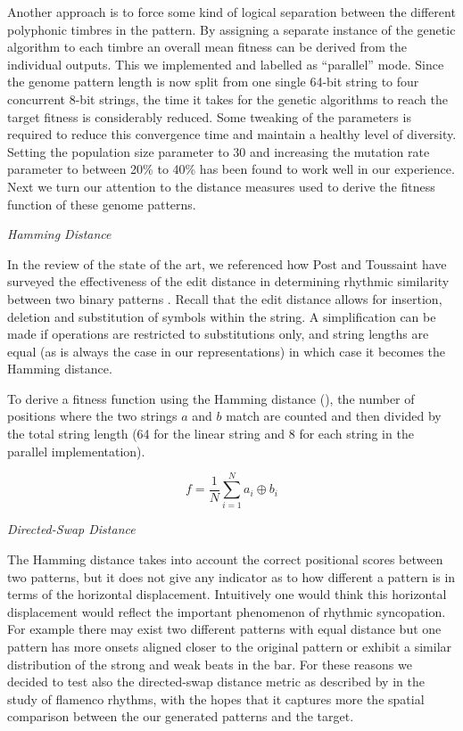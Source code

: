 Another approach is to force some kind of logical separation between the different polyphonic timbres in the pattern. By assigning a separate instance of the genetic algorithm to each timbre an overall mean fitness can be derived from the individual outputs. This we implemented and labelled as ``parallel'' mode. Since the genome pattern length is now split from one single 64-bit string to four concurrent 8-bit strings, the time it takes for the genetic algorithms to reach the target fitness is considerably reduced. Some tweaking of the parameters is required to reduce this convergence time and maintain a healthy level of diversity. Setting the population size parameter to 30 and increasing the mutation rate parameter to between 20\% to 40\% has been found to work well in our experience. Next we turn our attention to the distance measures used to derive the fitness function of these genome patterns.

\textit{Hamming Distance}

In the review of the state of the art, we referenced how Post and Toussaint have surveyed the effectiveness of the edit distance in determining rhythmic similarity between two binary patterns \citep{Post2011} . Recall that the edit distance allows for insertion, deletion and substitution of symbols within the string. A simplification can be made if operations are restricted to substitutions only, and string lengths are equal (as is always the case in our representations) in which case it becomes the Hamming distance. 

To derive a fitness function using the Hamming distance (), the number of positions where the two strings $a$ and $b$ match are counted and then divided by the total string length (64 for the linear string and 8 for each string in the parallel implementation). 

\begin{equation}
\label{eq:fitness_hamming}
	f=\frac{1}{N}\sum_{i=1}^{N}a_i \oplus b_i
\end{equation}

\textit{Directed-Swap Distance}

The Hamming distance takes into account the correct positional scores between two patterns, but it does not give any indicator as to how different a pattern is in terms of the horizontal displacement. Intuitively one would think this horizontal displacement would reflect the important phenomenon of rhythmic syncopation. For example there may exist two different patterns with equal distance but one pattern has more onsets aligned closer to the original pattern or exhibit a similar distribution of the strong and weak beats in the bar. For these reasons we decided to test also the directed-swap distance metric as described by \cite{Diaz-Banez2004} in the study of flamenco rhythms, with the hopes that it captures more the spatial comparison between the our generated patterns and the target.

